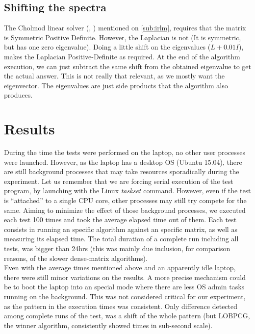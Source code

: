 \subsection{Shifting the spectra}

The \gls{Cholmod} linear solver (\cite{cholmod08},
  \cite{cholmod08a}) mentioned on \cref{sub:irlm}, requires
that the matrix is Symmetric Positive Definite. However, the
\gls{Laplacian} is not (It is symmetric, but has 
one zero eigenvalue). Doing a little shift on the eigenvalues ($L +
0.01I$), makes the \gls{Laplacian} Positive-Definite as required. At the
end of the algorithm execution, we can just subtract the same shift from
the obtained eigenvalue to get the actual answer. This is not really
that relevant, as we mostly want the eigenvector. The eigenvalues are
just side products that the algorithm also produces. 

\section{Results}

During the time the tests were performed on the laptop, no other
user processes were launched. However, as the laptop has a desktop OS
(Ubuntu 15.04), there are still background 
processes that may take resources sporadically during the 
experiment. Let us remember that we are forcing serial execution
of the test program, by launching with the Linux \emph{taskset}
command. However, even if the test is ``attached'' to a single CPU
core, other processes may still try compete for the same. Aiming to
minimize the effect of those background 
processes, we executed each test 100 times and took the average
elapsed time out of them. Each test consists in running an specific
algorithm against an specific matrix, as well as measuring its elapsed
time. The total duration of a complete  
run including all tests, was bigger than 24hrs (this was mainly due
inclusion, for comparison reasons, of the slower dense-matrix algorithms). \\

Even with the average times mentioned above and an apparently idle
laptop, there were still minor
variations on the results. A more precise mechanism could be to boot
the laptop into an special mode where there are less OS admin tasks
running on the background. This was not considered critical for our
experiment, as the pattern in the execution times was consistent. Only
difference detected among complete runs of the test, was a shift of
the whole pattern (but \gls{LOBPCG}, the winner algorithm,
consistently showed times in sub-second scale). \\ 


